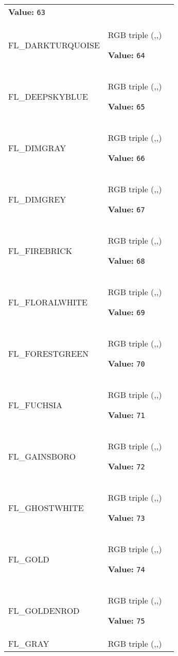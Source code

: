 \begin{longtable}{|p{\varnamewidth}|p{\vardescrwidth}|l}
\textbf{Value:} 
{\tt 63}&\\
\cline{1-2}
\raggedright F\-L\-\_\-D\-A\-R\-K\-T\-U\-R\-Q\-U\-O\-I\-S\-E\- & \raggedright RGB triple (,,)

\textbf{Value:} 
{\tt 64}&\\
\cline{1-2}
\raggedright F\-L\-\_\-D\-E\-E\-P\-S\-K\-Y\-B\-L\-U\-E\- & \raggedright RGB triple (,,)

\textbf{Value:} 
{\tt 65}&\\
\cline{1-2}
\raggedright F\-L\-\_\-D\-I\-M\-G\-R\-A\-Y\- & \raggedright RGB triple (,,)

\textbf{Value:} 
{\tt 66}&\\
\cline{1-2}
\raggedright F\-L\-\_\-D\-I\-M\-G\-R\-E\-Y\- & \raggedright RGB triple (,,)

\textbf{Value:} 
{\tt 67}&\\
\cline{1-2}
\raggedright F\-L\-\_\-F\-I\-R\-E\-B\-R\-I\-C\-K\- & \raggedright RGB triple (,,)

\textbf{Value:} 
{\tt 68}&\\
\cline{1-2}
\raggedright F\-L\-\_\-F\-L\-O\-R\-A\-L\-W\-H\-I\-T\-E\- & \raggedright RGB triple (,,)

\textbf{Value:} 
{\tt 69}&\\
\cline{1-2}
\raggedright F\-L\-\_\-F\-O\-R\-E\-S\-T\-G\-R\-E\-E\-N\- & \raggedright RGB triple (,,)

\textbf{Value:} 
{\tt 70}&\\
\cline{1-2}
\raggedright F\-L\-\_\-F\-U\-C\-H\-S\-I\-A\- & \raggedright RGB triple (,,)

\textbf{Value:} 
{\tt 71}&\\
\cline{1-2}
\raggedright F\-L\-\_\-G\-A\-I\-N\-S\-B\-O\-R\-O\- & \raggedright RGB triple (,,)

\textbf{Value:} 
{\tt 72}&\\
\cline{1-2}
\raggedright F\-L\-\_\-G\-H\-O\-S\-T\-W\-H\-I\-T\-E\- & \raggedright RGB triple (,,)

\textbf{Value:} 
{\tt 73}&\\
\cline{1-2}
\raggedright F\-L\-\_\-G\-O\-L\-D\- & \raggedright RGB triple (,,)

\textbf{Value:} 
{\tt 74}&\\
\cline{1-2}
\raggedright F\-L\-\_\-G\-O\-L\-D\-E\-N\-R\-O\-D\- & \raggedright RGB triple (,,)

\textbf{Value:} 
{\tt 75}&\\
\cline{1-2}
\raggedright F\-L\-\_\-G\-R\-A\-Y\- & \raggedright RGB triple (,,)


\end{longtable}
